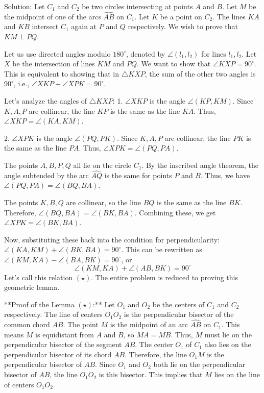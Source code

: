 Solution:
Let $C_1$ and $C_2$ be two circles intersecting at points $A$ and $B$. Let $M$ be the midpoint of one of the arcs $\widehat{AB}$ on $C_1$. Let $K$ be a point on $C_2$. The lines $KA$ and $KB$ intersect $C_1$ again at $P$ and $Q$ respectively. We wish to prove that $KM \perp PQ$.

Let us use directed angles modulo $180^\circ$, denoted by $\angle(l_1, l_2)$ for lines $l_1, l_2$. Let $X$ be the intersection of lines $KM$ and $PQ$. We want to show that $\angle KXP = 90^\circ$. This is equivalent to showing that in $\triangle KXP$, the sum of the other two angles is $90^\circ$, i.e., $\angle XKP + \angle XPK = 90^\circ$.

Let's analyze the angles of $\triangle KXP$:
1.  $\angle XKP$ is the angle $\angle(KP, KM)$. Since $K, A, P$ are collinear, the line $KP$ is the same as the line $KA$. Thus, $\angle XKP = \angle(KA, KM)$.

2.  $\angle XPK$ is the angle $\angle(PQ, PK)$. Since $K, A, P$ are collinear, the line $PK$ is the same as the line $PA$. Thus, $\angle XPK = \angle(PQ, PA)$.

The points $A, B, P, Q$ all lie on the circle $C_1$. By the inscribed angle theorem, the angle subtended by the arc $\widehat{AQ}$ is the same for points $P$ and $B$. Thus, we have $\angle(PQ, PA) = \angle(BQ, BA)$.

The points $K, B, Q$ are collinear, so the line $BQ$ is the same as the line $BK$. Therefore, $\angle(BQ, BA) = \angle(BK, BA)$.
Combining these, we get $\angle XPK = \angle(BK, BA)$.

Now, substituting these back into the condition for perpendicularity:
$\angle(KA, KM) + \angle(BK, BA) = 90^\circ$.
This can be rewritten as $\angle(KM, KA) - \angle(BA, BK) = 90^\circ$, or
$$ \angle(KM, KA) + \angle(AB, BK) = 90^\circ $$
Let's call this relation $(\star)$. The entire problem is reduced to proving this geometric lemma.

**Proof of the Lemma $(\star)$:**
Let $O_1$ and $O_2$ be the centers of $C_1$ and $C_2$ respectively. The line of centers $O_1O_2$ is the perpendicular bisector of the common chord $AB$.
The point $M$ is the midpoint of an arc $\widehat{AB}$ on $C_1$. This means $M$ is equidistant from $A$ and $B$, so $MA = MB$. Thus, $M$ must lie on the perpendicular bisector of the segment $AB$.
The center $O_1$ of $C_1$ also lies on the perpendicular bisector of its chord $AB$.
Therefore, the line $O_1M$ is the perpendicular bisector of $AB$.
Since $O_1$ and $O_2$ both lie on the perpendicular bisector of $AB$, the line $O_1O_2$ is this bisector. This implies that $M$ lies on the line of centers $O_1O_2$.


